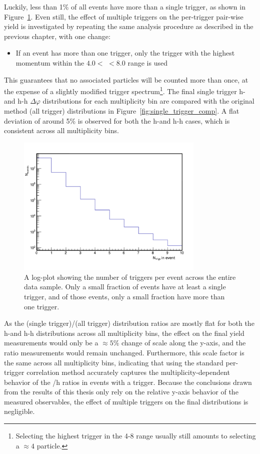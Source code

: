 Luckily, less than 1\% of all events have more than a single trigger, as shown in Figure~\ref{fig:trigs_per_event}. Even still, the effect of multiple triggers on the per-trigger pair-wise yield is investigated by repeating the same analysis procedure as described in the previous chapter, with one change:
%
\begin{itemize}
    \item If an event has more than one trigger, only the trigger with the highest momentum within the $4.0 <$ \pt $< 8.0$ \GeVc range is used
\end{itemize}
%
This guarantees that no associated particles will be counted more than once, at the expense of a slightly modified trigger \pt spectrum\footnote{Selecting the highest \pt trigger in the 4-8 \GeVc range usually still amounts to selecting a $\approx 4$ \GeVc particle.}. The final single trigger h-\lmb and h-h $\Delta\varphi$ distributions for each multiplicity bin are compared with the original method (all trigger) distributions in Figure~\ref{fig:single_trigger_comp}. A flat deviation of around 5\% is observed for both the h-\lmb and h-h cases, which is consistent across all multiplicity bins.

\begin{figure}[ht!]
    \centering
    \includegraphics[width=0.8\textwidth]{figures/analysis/trig_per_event.pdf}
    \caption{A log-plot showing the number of triggers per event across the entire data sample. Only a small fraction of events have at least a single trigger, and of those events, only a small fraction have more than one trigger.}
    \label{fig:trigs_per_event}
\end{figure}

As the (single trigger)/(all trigger) distribution ratios are mostly flat for both the h-\lmb and h-h distributions across all multiplicity bins, the effect on the final yield measurements would only be a $\approx 5\%$ change of scale along the y-axis, and the ratio measurements would remain unchanged. Furthermore, this scale factor is the same across all multiplicity bins, indicating that using the standard per-trigger correlation method accurately captures the multiplicity-dependent behavior of the \lmb/h ratios in events with a trigger. Because the conclusions drawn from the results of this thesis only rely on the relative y-axis behavior of the measured observables, the effect of multiple triggers on the final distributions is negligible.


